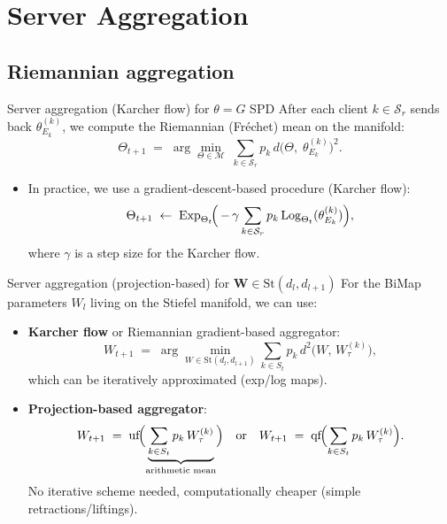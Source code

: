 \documentclass[aspectratio=169,xcolor=dvipsnames]{beamer}
\begin{document}
\section{Server Aggregation}
\subsection{Riemannian aggregation}
\begin{frame}{Server aggregation (Karcher flow) for $\theta=G$ SPD}
After each client $k \in \mathcal{S}_r$ sends back $\theta_{E_k}^{(k)}$, we compute the Riemannian (Fréchet) mean on the manifold:
\[
  \Theta_{t+1} \;=\; 
    \arg\min_{\Theta\in\mathcal{M}} \;\sum_{k\in \mathcal{S}_r} p_k\,d\bigl(\Theta,\;\theta_{E_k}^{(k)}\bigr)^2.
\]
\begin{itemize}
\item In practice, we use a gradient-descent-based procedure (Karcher flow):
\[
   \Theta_{t+1} 
   \;\leftarrow\; 
   \mathrm{Exp}_{\Theta_{t}}\!\Bigl(\,-\,\gamma\sum_{k\in \mathcal{S}_r} 
   p_k\,\mathrm{Log}_{\Theta_{t}}(\theta_{E_k}^{(k)})\Bigr),
\]
where $\gamma$ is a step size for the Karcher flow.
\end{itemize}

\end{frame}




\begin{frame}{Server aggregation (projection-based) for \(\mathbf{W}\in \mathrm{St}(d_l,d_{l+1})\)}
For the BiMap parameters \(W_l\) living on the Stiefel manifold, we can use:

\begin{itemize}
    \item \textbf{Karcher flow} or Riemannian gradient-based aggregator: 
    \[
      W_{t+1}
      \;=\;
      \arg\!\min_{W\in \mathrm{St}(d_l,d_{l+1})}
      \sum_{k\in S_t} p_k\,d^2\bigl(W,\,W_{\tau}^{(k)}\bigr),
    \]
    which can be iteratively approximated (exp/log maps).
    \item \textbf{Projection-based aggregator}:
    \[
      W_{t+1}
      \;=\; \mathrm{uf}\!\Bigl(\underbrace{\sum_{k\in S_t}p_k\,W_{\tau}^{(k)}}_{\text{arithmetic mean}}\Bigr)
      \quad\text{or}\quad
      W_{t+1}
      \;=\; \mathrm{qf}\!\Bigl(\sum_{k\in S_t}p_k\,W_{\tau}^{(k)}\Bigr).
    \]
     No iterative scheme needed, computationally cheaper (simple retractions/liftings).
\end{itemize}
\end{frame}
\end{document}
